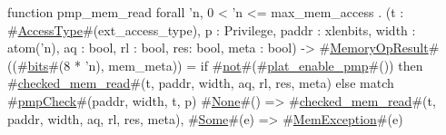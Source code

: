function pmp_mem_read forall 'n, 0 < 'n <= max_mem_access . (t : #\hyperref[sailRISCVzAccessType]{AccessType}#(ext_access_type), p : Privilege, paddr : xlenbits, width : atom('n), aq : bool, rl : bool, res: bool, meta : bool) -> #\hyperref[sailRISCVzMemoryOpResult]{MemoryOpResult}#((#\hyperref[sailRISCVzbits]{bits}#(8 * 'n), mem_meta)) =
  if   #\hyperref[sailRISCVznot]{not}#(#\hyperref[sailRISCVzplatzyenablezypmp]{plat\_enable\_pmp}#())
  then #\hyperref[sailRISCVzcheckedzymemzyread]{checked\_mem\_read}#(t, paddr, width, aq, rl, res, meta)
  else {
    match #\hyperref[sailRISCVzpmpCheck]{pmpCheck}#(paddr, width, t, p) {
      #\hyperref[sailRISCVzNone]{None}#()  => #\hyperref[sailRISCVzcheckedzymemzyread]{checked\_mem\_read}#(t, paddr, width, aq, rl, res, meta),
      #\hyperref[sailRISCVzSome]{Some}#(e) => #\hyperref[sailRISCVzMemException]{MemException}#(e)
    }
  }
